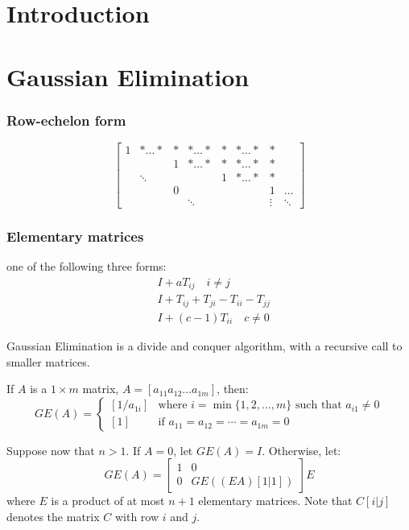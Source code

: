 
\newcommand{\mytitle}{Linera Algebra / Parallel}
\newcommand{\mychpnr}{7}


\section{Introduction}


\section{Gaussian Elimination}

\begin{frame}
\frametitle{Row-echelon form}

$$
\left[\begin{array}{cccccccc}
1 & *\ldots * & * & *\ldots * & * & *\ldots * & * & \\
  &           & 1 & *\ldots * & * & *\ldots * & * & \\
  &  \ddots   &   &           & 1 & *\ldots * & * & \\
  &           & 0 &           &   &           & 1 & \ldots \\
  &           &   &  \ddots   &   &           & \vdots & \ddots
\end{array}\right]
$$
\end{frame}

\begin{frame}
\frametitle{Elementary matrices}

one of the following three forms:
\begin{align*}
& I+aT_{ij} \quad i\neq j        \tag{elementary of type 1} \\
& I+T_{ij}+T_{ji}-T_{ii}-T_{jj}  \tag{elementary of type 2} \\
& I+(c-1)T_{ii} \quad c\neq 0    \tag{elementary of type 3}
\end{align*} 
\end{frame}

\begin{frame}
Gaussian Elimination is a divide and conquer algorithm,
with a recursive call to smaller matrices.

If $A$ is a $1\times m$ matrix, $A=[a_{11} a_{12} \ldots a_{1m}]$,
then:
$$
GE(A)=\begin{cases}
[1/a_{1i}] & \text{where $i=\min\{1,2,\ldots,m\}$ such that
                   $a_{i1}\neq 0$} \\
[1]        & \text{if $a_{11}=a_{12}=\cdots=a_{1m}=0$}
\end{cases}
$$

Suppose now that $n>1$.  If $A=0$, let $GE(A)=I$.  Otherwise, let:
$$
GE(A)=\left[\begin{array}{cc}
1 & 0 \\
0 & GE((EA)[1|1])
\end{array}\right]E
$$
where $E$ is a product of at most $n+1$ elementary matrices.
Note that $C[i|j]$ denotes the matrix $C$ with row $i$ and $j$.
\end{frame}

